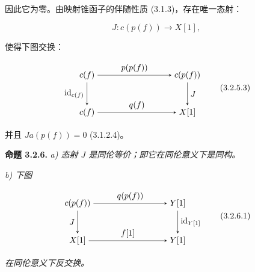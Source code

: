 \clearpage
{}%
因此它为零。由映射锥函子的伴随性质 (3.1.3)，存在唯一态射：

\begin{equation}
  J\colon c(p(f))\longrightarrow X[1],
  \tag{3.2.5.2}
\end{equation}

\noindent 使得下图交换：

\begin{equation}
  \begin{tikzpicture}[>=stealth,baseline=(current bounding box.center)]
    \node (Cf1) at (0,1.55) {$c(f)$};
    \node (Cpf) at (4.2,1.55) {$c(p(f))$};
    \node (Cf2) at (0,0) {$c(f)$};
    \node (Xs)  at (4.2,0) {$X[1]$};
    \draw[->] (Cf1) -- node[above] {$p(p(f))$} (Cpf);
    \draw[->] (Cf1) -- node[left] {$\operatorname{id}_{c(f)}$} (Cf2);
    \draw[->] (Cpf) -- node[right] {$J$} (Xs);
    \draw[->] (Cf2) -- node[above] {$q(f)$} (Xs);
  \end{tikzpicture}
  \tag{3.2.5.3}
\end{equation}

\noindent 并且 $Ja(p(f))=0$ (3.1.2.4)。

\noindent\textbf{命题 3.2.6.}\quad
{}
\emph{a) 态射 $J$ 是同伦等价；即它在同伦意义下是同构。}

\emph{b) 下图}

\begin{equation}
  \begin{tikzpicture}[>=stealth,baseline=(current bounding box.center)]
    \node (Cpf) at (0,1.55) {$c(p(f))$};
    \node (Ys1) at (4.2,1.55) {$Y[1]$};
    \node (Xs)  at (0,0) {$X[1]$};
    \node (Ys2) at (4.2,0) {$Y[1]$};
    \draw[->] (Cpf) -- node[above] {$q(p(f))$} (Ys1);
    \draw[->] (Cpf) -- node[left] {$J$} (Xs);
    \draw[->] (Ys1) -- node[right] {$\operatorname{id}_{Y[1]}$} (Ys2);
    \draw[->] (Xs) -- node[above] {$f[1]$} (Ys2);
  \end{tikzpicture}
  \tag{3.2.6.1}
\end{equation}

\noindent\emph{在同伦意义下反交换。}


